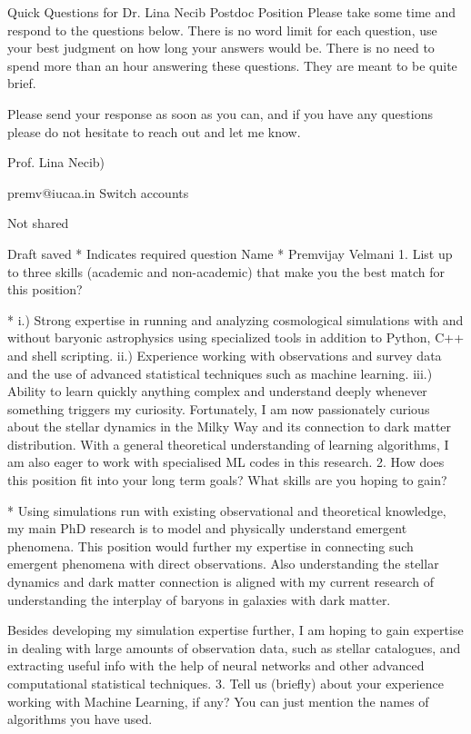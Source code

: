 Quick Questions for Dr. Lina Necib Postdoc Position
Please take some time and respond to the questions below. There is no word limit for each question, use your best judgment on how long your answers would be. There is no need to spend more than an hour answering these questions. They are meant to be quite brief.  

Please send your response as soon as you can, and if you have any questions please do not hesitate to reach out and let me know.

Prof. Lina Necib)


premv@iucaa.in Switch accounts
 
Not shared
 
Draft saved
* Indicates required question
Name 
*
Premvijay Velmani
1. List up to three skills (academic and non-academic) that make you the best match for this position?

*
i.) Strong expertise in running and analyzing cosmological simulations with and without baryonic astrophysics using specialized tools in addition to Python, C++ and shell scripting.
ii.) Experience working with observations and survey data and the use of advanced statistical techniques such as machine learning.
iii.) Ability to learn quickly anything complex and understand deeply whenever something triggers my curiosity. Fortunately, I am now passionately curious about the stellar dynamics in the Milky Way and its connection to dark matter distribution. With a general theoretical understanding of learning algorithms, I am also eager to work with specialised ML codes in this research.
2. How does this position fit into your long term goals? What skills are you hoping to gain?

*
Using simulations run with existing observational and theoretical knowledge, my main PhD research is to model and physically understand emergent phenomena. This position would further my expertise in connecting such emergent phenomena with direct observations. Also understanding the stellar dynamics and dark matter connection is aligned with my current research of understanding the interplay of baryons in galaxies with dark matter. 

Besides developing my simulation expertise further, I am hoping to gain expertise in 
dealing with large amounts of observation data, such as stellar catalogues, and extracting useful info with the help of neural networks and other advanced computational statistical techniques.
3. Tell us (briefly) about your experience working with Machine Learning, if any? You can just mention the names of algorithms you have used.

